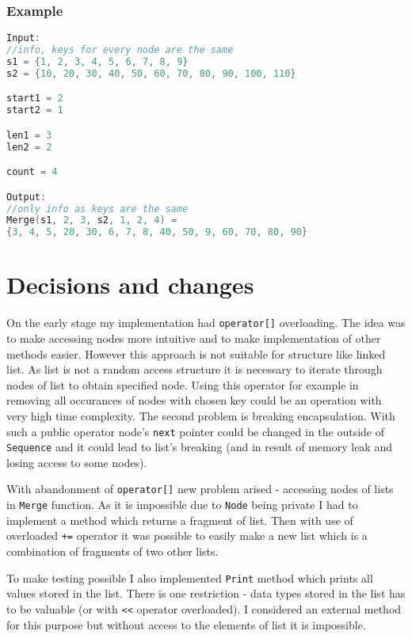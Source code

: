 \documentclass{article}
\begin{document}
\subsubsection*{Example}

\begin{lstlisting}[language=C++]
Input:
//info, keys for every node are the same
s1 = {1, 2, 3, 4, 5, 6, 7, 8, 9}
s2 = {10, 20, 30, 40, 50, 60, 70, 80, 90, 100, 110}

start1 = 2
start2 = 1

len1 = 3
len2 = 2

count = 4

Output:
//only info as keys are the same
Merge(s1, 2, 3, s2, 1, 2, 4) =
{3, 4, 5, 20, 30, 6, 7, 8, 40, 50, 9, 60, 70, 80, 90}
\end{lstlisting}
\newpage

\section{Decisions and changes}

On the early stage my implementation had {\tt operator[]} overloading. The idea was
to make accessing nodes more intuitive and to make implementation of other methods
easier. However this approach is not suitable for structure like linked list.
As list is not a random access structure it is necessary to iterate through nodes
of list to obtain specified node. Using this operator for example in removing all
occurances of nodes with chosen key could be an operation with very high time complexity.
The second problem is breaking encapsulation. With such a public operator node's {\tt next}
pointer could be changed in the outside of {\tt Sequence} and it could lead to list's
breaking (and in result of memory leak and losing access to some nodes).

\indent
With abandonment of {\tt operator[]} new problem arised - accessing nodes of lists
in {\tt Merge} function. As it is impossible due to {\tt Node} being private I had
to implement a method which returns a fragment of list. Then with use of overloaded
{\tt +=} operator it was possible to easily make a new list which is a combination of fragments
of two other lists.

\indent
To make testing possible I also implemented {\tt Print} method which prints all values
stored in the list. There is one restriction - data types stored in the list has to be
valuable (or with {\tt <<} operator overloaded). I considered an external method for this
purpose but without access to the elements of list it is impossible.
\end{document}
